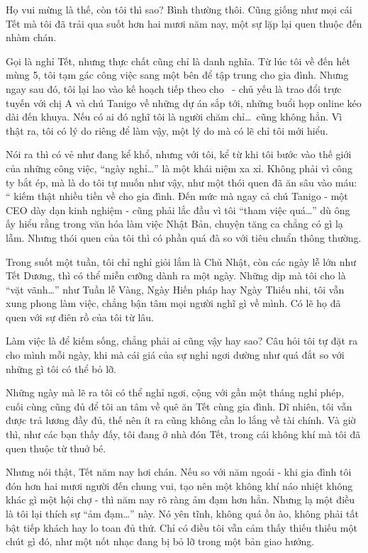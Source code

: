 \documentclass[../main.tex]{subfiles}
\begin{document}
Họ vui mừng là thế, còn tôi thì sao? Bình thường thôi. Cũng giống như mọi cái Tết mà tôi đã trải qua suốt hơn hai mươi năm nay, một sự lặp lại quen thuộc đến nhàm chán.

Gọi là nghỉ Tết, nhưng thực chất cũng chỉ là danh nghĩa. Từ lúc tôi về đến hết mùng 5, tôi tạm gác công việc sang một bên để tập trung cho gia đình. Nhưng ngay sau đó, tôi lại lao vào kế hoạch tiếp theo cho \hll\ - chủ yếu là trao đổi trực tuyến với chị A và chú Tanigo về những dự án sắp tới, những buổi họp online kéo dài đến khuya. Nếu có ai đó nghĩ tôi là người chăm chỉ\dots\ cũng không hẳn. Vì thật ra, tôi có lý do riêng để làm vậy, một lý do mà có lẽ chỉ tôi mới hiểu.

Nói ra thì có vẻ như đang kể khổ, nhưng với tôi, kể từ khi tôi bước vào thế giới của những công việc, ``ngày nghỉ\dots'' là một khái niệm xa xỉ. Không phải vì công ty bắt ép, mà là do tôi tự muốn như vậy, như một thói quen đã ăn sâu vào máu: `` kiếm thật nhiều tiền về cho gia đình. Đến mức mà ngay cả chú Tanigo - một CEO dày dạn kinh nghiệm - cũng phải lắc đầu vì tôi ``tham việc quá\dots'' dù ông ấy hiểu rằng trong văn hóa làm việc Nhật Bản, chuyện tăng ca chẳng có gì lạ lẫm. Nhưng thói quen của tôi thì có phần quá đà so với tiêu chuẩn thông thường.

Trong suốt một tuần, tôi chỉ nghỉ giỏi lắm là Chủ Nhật, còn các ngày lễ lớn như Tết Dương, thì có thể miễn cưỡng dành ra một ngày. Những dịp mà tôi cho là ``vặt vãnh\dots'' như Tuần lễ Vàng, Ngày Hiến pháp hay Ngày Thiếu nhi, tôi vẫn xung phong làm việc, chẳng bận tâm mọi người nghĩ gì về mình. Có lẽ họ đã quen với sự điên rồ của tôi từ lâu.

Làm việc là để kiếm sống, chẳng phải ai cũng vậy hay sao? Câu hỏi tôi tự đặt ra cho mình mỗi ngày, khi mà cái giá của sự nghỉ ngơi dường như quá đắt so với những gì tôi có thể bỏ lỡ.

Những ngày mà lẽ ra tôi có thể nghỉ ngơi, cộng với gần một tháng nghỉ phép, cuối cùng cũng đủ để tôi an tâm về quê ăn Tết cùng gia đình. Dĩ nhiên, tôi vẫn được trả lương đầy đủ, thế nên ít ra cũng không cần lo lắng về tài chính. Và giờ thì, như các bạn thấy đấy, tôi đang ở nhà đón Tết, trong cái không khí mà tôi đã quen thuộc từ thuở bé.

Nhưng nói thật, Tết năm nay hơi chán. Nếu so với năm ngoái - khi gia đình tôi đón hơn hai mươi người đến chung vui, tạo nên một không khí náo nhiệt không khác gì một hội chợ - thì năm nay rõ ràng ảm đạm hơn hẳn. Nhưng lạ một điều là tôi lại thích sự ``ảm đạm\dots'' này. Nó yên tĩnh, không quá ồn ào, không phải tất bật tiếp khách hay lo toan đủ thứ. Chỉ có điều tôi vẫn cảm thấy thiếu thiếu một chút gì đó, như một nốt nhạc đang bị bỏ lỡ trong một bản giao hưởng.
\end{document}
